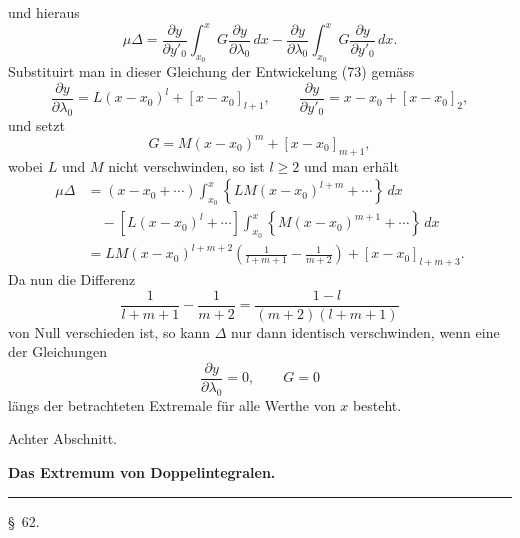 \documentclass[11pt,a4paper,leqno]{article}
\begin{document}
und hieraus
\[
\mu\Delta=
\frac{\partial y}{\partial y'_0}
\int_{x_0}^{x}G\frac{\partial y}{\partial\lambda_0}\,dx
-\frac{\partial y}{\partial\lambda_0}
\int_{x_0}^{x}G\frac{\partial y}{\partial y'_0}\,dx.
\]
Substituirt man in dieser Gleichung der Entwickelung (73) gemäss
\[
\frac{\partial y}{\partial\lambda_0}
=L(x-x_0)^l+[x-x_0]_{l+1},\qquad
\frac{\partial y}{\partial y'_0}=x-x_0+[x-x_0]_2,
\]
und setzt
\[
G=M(x-x_0)^m+[x-x_0]_{m+1},
\]
wobei $L$ und $M$ nicht verschwinden, so ist $l\geq 2$ und man erhält
\[
\begin{aligned}
\mu\Delta
&=(x-x_0+\cdots)
\int_{x_0}^{x}\left\{LM(x-x_0)^{l+m}+\cdots\right\}\,dx\\
&\quad-[L(x-x_0)^l+\cdots]
\int_{x_0}^{x}\left\{M(x-x_0)^{m+1}+\cdots\right\}\,dx\\
&=LM(x-x_0)^{l+m+2}
\left(\frac{1}{l+m+1}-\frac{1}{m+2}\right)
+[x-x_0]_{l+m+3}.
\end{aligned}
\]
Da nun die Differenz
\[
\frac{1}{l+m+1}-\frac{1}{m+2}
=\frac{1-l}{(m+2)(l+m+1)}
\]
von Null verschieden ist, so kann $\Delta$ nur dann identisch verschwinden,
wenn eine der Gleichungen
\[
\frac{\partial y}{\partial\lambda_0}=0,\qquad G=0
\]
längs der betrachteten Extremale für alle Werthe von $x$ besteht.


\begin{center}
{\large Achter Abschnitt.}\par\vspace{1.5em}
{\Large\bfseries Das Extremum von Doppelintegralen.}\par\vspace{1.4em}
\rule{2.4cm}{0.4pt}\par\vspace{1.5em}
{\large \S~62.}
\end{center}
\end{document}
